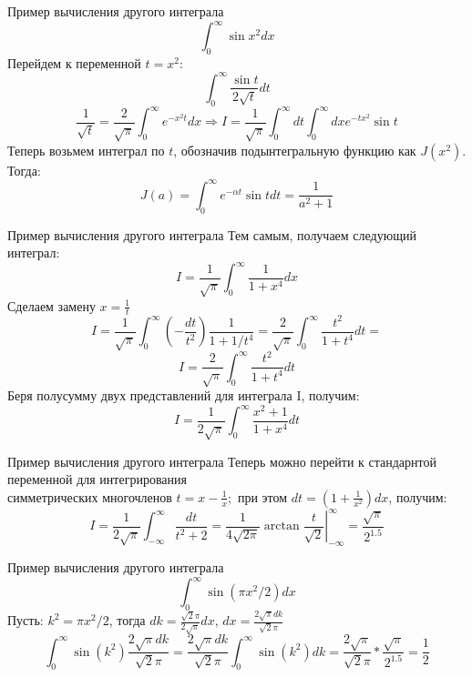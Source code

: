 \begin{frame}{Пример вычисления другого интеграла}
$$\int_{0}^{\infty} \sin x^{2} d x$$
Перейдем к переменной $t=x^2$:
$$\int_{0}^{\infty} \frac{\sin t}{2\sqrt{t}}dt$$
$$
\frac{1}{\sqrt{t}}=\frac{2}{\sqrt{\pi}} \int_{0}^{\infty} e^{-x^{2} t} d x \Rightarrow I=\frac{1}{\sqrt{\pi}} \int_{0}^{\infty} d t \int_{0}^{\infty} d x e^{-t x^{2}} \sin t
$$
Теперь возьмем интеграл по $t$, обозначив подынтегральную функцию как $J\left(x^{2}\right)$. Тогда:
$$
J(a)=\int_{0}^{\infty} e^{-\alpha t} \sin t d t=\frac{1}{a^{2}+1}
$$
\end{frame}

\begin{frame}{Пример вычисления другого интеграла}
Тем самым, получаем следующий интеграл:
$$
I=\frac{1}{\sqrt{\pi}} \int_{0}^{\infty} \frac{1}{1+x^{4}} d x
$$
Сделаем замену $x=\frac{1}{t}$
$$
I=\frac{1}{\sqrt{\pi}} \int_{0}^{\infty}\left(-\frac{d t}{t^{2}}\right) \frac{1}{1+1 / t^{4}}=\frac{2}{\sqrt{\pi}} \int_{0}^{\infty} \frac{t^2}{1+t^{4}} d t=
$$
$$
I=\frac{2}{\sqrt{\pi}} \int_{0}^{\infty} \frac{t^2}{1+t^{4}} d t
$$
Беря полусумму двух представлений для интеграла I, получим:
$$
I=\frac{1}{2\sqrt{\pi}} \int_{0}^{\infty} \frac{x^2+1}{1+x^{4}} d t
$$
\end{frame}

\begin{frame}{Пример вычисления другого интеграла}
Теперь можно перейти к стандарнтой переменной для интегрирования \\
симметрических многочленов $t=x-\frac{1}{x} ;$ при этом $d t=\left(1+\frac{1}{x^{2}}\right) d x$, получим:
$$
I=\frac{1}{2\sqrt{\pi}} \int_{-\infty}^{\infty} \frac{d t}{t^{2}+2}=\left.\frac{1}{4 \sqrt{2 \pi}} \arctan \frac{t}{\sqrt{2}}\right|_{-\infty} ^{\infty}=\frac{\sqrt{\pi}}{2^{1.5}}
$$
\end{frame}

\begin{frame}{Пример вычисления другого интеграла}
$$
\int_{0}^{\infty} \sin \left(\pi x^{2} / 2\right) d x
$$
Пусть: $k^2=\pi x^{2} / 2$, тогда $dk=\frac{\sqrt{2}\pi}{2\sqrt{\pi}}dx$, $dx=\frac{2\sqrt{\pi}dk}{\sqrt{2}\pi}$
$$
\int_{0}^{\infty} \sin \left(k^2\right) \frac{2\sqrt{\pi}dk}{\sqrt{2}\pi}=\frac{2\sqrt{\pi}dk}{\sqrt{2}\pi}\int_{0}^{\infty} \sin \left(k^2\right)dk=\frac{2\sqrt{\pi}}{\sqrt{2}\pi}*\frac{\sqrt{\pi}}{2^{1.5}}=\frac{1}{2}
$$
\end{frame}

